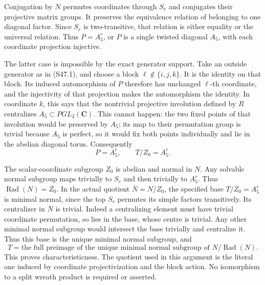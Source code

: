 Conjugation by \(N\) permutes coordinates through \(S_r\)
and conjugates their projective matrix groups. It preserves
the equivalence relation of belonging to one diagonal factor.
Since \(S_r\) is two-transitive, that relation is either
equality or the universal relation. Thus \(P=A_5^r\),
or \(P\) is a single twisted diagonal \(A_5\), with
each coordinate projection injective.

The latter case is impossible by the exact generator support.
Take an outside generator as in (S47.1), and choose a block
\(\ell\notin\{i,j,k\}\). It is the identity on that
block. Its induced automorphism of \(P\) therefore has
unchanged \(\ell\)-th coordinate, and the injectivity
of that projection makes the automorphism the identity.
In coordinate \(k\), this says that the nontrivial
projective involution defined by \(R\) centralizes
\(A_5\subset PGL_2(\mathbf C)\). This cannot happen:
the two fixed points of that involution would be preserved
by \(A_5\); its map to their permutation group is trivial
because \(A_5\) is perfect, so it would fix both points
individually and lie in the abelian diagonal torus.
Consequently
\[
          P=A_5^r,\qquad T/Z_0=A_5^r.
 \tag{S47.4}
\]

The scalar-coordinate subgroup \(Z_0\) is abelian and
normal in \(N\). Any solvable normal subgroup maps
trivially to \(S_r\) and then trivially to \(A_5^r\).
Thus \(\operatorname{Rad}(N)=Z_0\). In the actual
quotient \(\overline N=N/Z_0\), the specified base
\(T/Z_0=A_5^r\) is minimal normal, since the top \(S_r\)
permutes its simple factors transitively. Its centralizer
in \(\overline N\) is trivial. Indeed a centralizing
element must have trivial coordinate permutation, so lies
in the base, whose centre is trivial. Any other minimal
normal subgroup would intersect the base trivially and
centralize it. Thus this base is the unique minimal normal
subgroup, and
\[
 T=\text{the full preimage of the unique minimal normal
 subgroup of }N/\operatorname{Rad}(N).
 \tag{S47.5}
\]
This proves characteristicness. The quotient used in this
argument is the literal one induced by coordinate
projectivization and the block action. No isomorphism
to a split wreath product is required or asserted.

